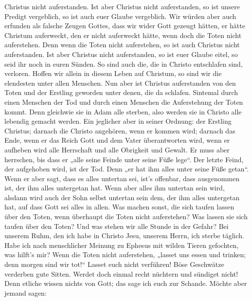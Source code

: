 Christus nicht auferstanden.  Ist aber Christus nicht
auferstanden, so ist unsere Predigt vergeblich, so ist auch euer Glaube
vergeblich.  Wir würden aber auch erfunden als falsche
Zeugen Gottes, dass wir wider Gott gezeugt hätten, er hätte Christum
auferweckt, den er nicht auferweckt hätte, wenn doch die Toten nicht
auferstehen.  Denn wenn die Toten nicht auferstehen, so ist
auch Christus nicht auferstanden.  Ist aber Christus nicht
auferstanden, so ist euer Glaube eitel, so seid ihr noch in euren
Sünden.  So sind auch die, die in Christo entschlafen sind,
verloren.  Hoffen wir allein in diesem Leben auf Christum,
so sind wir die elendesten unter allen Menschen.  Nun aber
ist Christus auferstanden von den Toten und der Erstling geworden unter
denen, die da schlafen.  Sintemal durch einen Menschen der
Tod und durch einen Menschen die Auferstehung der Toten kommt.
 Denn gleichwie sie in Adam alle sterben, also werden sie
in Christo alle lebendig gemacht werden.  Ein jeglicher
aber in seiner Ordnung: der Erstling Christus; darnach die Christo
angehören, wenn er kommen wird;  darnach das Ende, wenn er
das Reich Gott und dem Vater überantworten wird, wenn er aufheben wird
alle Herrschaft und alle Obrigkeit und Gewalt.  Er muss
aber herrschen, bis dass er „alle seine Feinde unter seine Füße lege``.
 Der letzte Feind, der aufgehoben wird, ist der Tod.
 Denn „er hat ihm alles unter seine Füße getan``. Wenn er
aber sagt, dass es alles untertan sei, ist's offenbar, dass ausgenommen
ist, der ihm alles untergetan hat.  Wenn aber alles ihm
untertan sein wird, alsdann wird auch der Sohn selbst untertan sein dem,
der ihm alles untergetan hat, auf dass Gott sei alles in allen.
 Was machen sonst, die sich taufen lassen über den Toten,
wenn überhaupt die Toten nicht auferstehen? Was lassen sie sich taufen
über den Toten?  Und was stehen wir alle Stunde in der
Gefahr?  Bei unserem Ruhm, den ich habe in Christo Jesu,
unserem Herrn, ich sterbe täglich.  Habe ich nach
menschlicher Meinung zu Ephesus mit wilden Tieren gefochten, was hilft's
mir? Wenn die Toten nicht auferstehen, „lasset uns essen und trinken;
denn morgen sind wir tot!{}``  Lasset euch nicht verführen!
Böse Geschwätze verderben gute Sitten.  Werdet doch einmal
recht nüchtern und sündiget nicht! Denn etliche wissen nichts von Gott;
das sage ich euch zur Schande.  Möchte aber jemand sagen:
